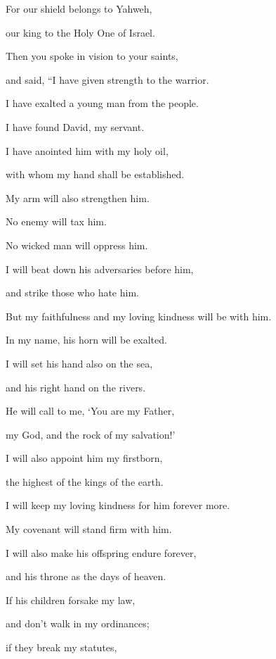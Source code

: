 {\par }{\Q {}For our shield belongs to Yahweh,
\par }{\QB our king to the Holy One of Israel.
\par }{\BB \par }{\Q {}Then you spoke in vision to your saints,
\par }{\QB and said, “I have given strength to the warrior.
\par }{\QB I have exalted a young man from the people.
\par }{\Q {}I have found David, my servant.
\par }{\QB I have anointed him with my holy oil,
\par }{\Q {}with whom my hand shall be established.
\par }{\QB My arm will also strengthen him.
\par }{\Q {}No enemy will tax him.
\par }{\QB No wicked man will oppress him.
\par }{\Q {}I will beat down his adversaries before him,
\par }{\QB and strike those who hate him.
\par }{\Q {}But my faithfulness and my loving kindness will be with him.
\par }{\QB In my name, his horn will be exalted.
\par }{\Q {}I will set his hand also on the sea,
\par }{\QB and his right hand on the rivers.
\par }{\Q {}He will call to me, ‘You are my Father,
\par }{\QB my God, and the rock of my salvation!’
\par }{\Q {}I will also appoint him my firstborn,
\par }{\QB the highest of the kings of the earth.
\par }{\Q {}I will keep my loving kindness for him forever more.
\par }{\QB My covenant will stand firm with him.
\par }{\Q {}I will also make his offspring endure forever,
\par }{\QB and his throne as the days of heaven.
\par }{\Q {}If his children forsake my law,
\par }{\QB and don’t walk in my ordinances;
\par }{\Q {}if they break my statutes,
}
